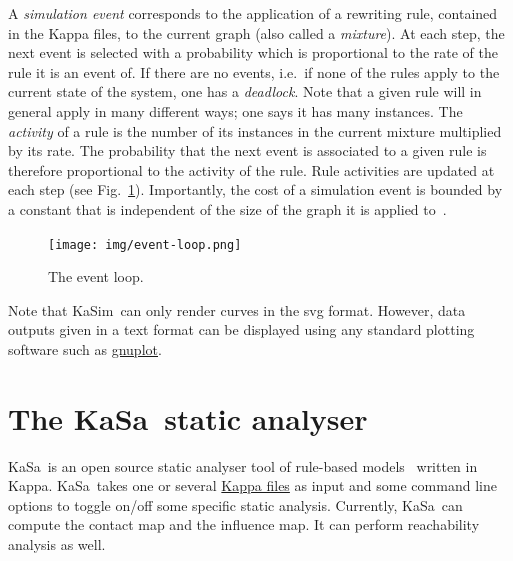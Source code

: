 \documentclass[11pt]{book}
\def\KaSim{\textsf{KaSim}}
\def\KaSa{\textsf{KaSa}}
\def\ie{i.e.~}
\begin{document}
A \emph{simulation event} corresponds to the application of a rewriting rule, contained in the Kappa files, to the current graph (also called a \emph{mixture}).
At each step, the next event %
is selected with a probability which is proportional to the rate of the rule it is an event of.
If there are no events, {\ie}if none of the rules apply to the current state of the system, one has a \emph{deadlock}. Note that a given rule will in general apply in many different ways; one says it has many instances. The \emph{activity} of a rule is the number of its instances in the current mixture multiplied by its rate. The probability that the next event is associated to a given rule is therefore proportional to the activity of the rule.
Rule activities are updated at
each step (see Fig.~\ref{fig:event-loop}). Importantly, the cost of a simulation event is bounded by a constant that is independent of the size of the graph it is applied to~\cite{Dan_etal07b}.

\begin{figure}[htbp]
\begin{center}
\texttt{[image: img/event-loop.png]}
\caption{The event loop.}
\label{fig:event-loop}
\end{center}
\end{figure}

Note that \KaSim~can only render curves in the svg format. However, data outputs given in a text format can be displayed using any standard plotting software such as \href{http://www.gnuplot.info/}{gnuplot}.

\section{The \KaSa~static analyser}

\KaSa~is an open source static analyser  tool of rule-based models~\cite{DanLan04,Dan_etal07a,Fae_etal05} written in Kappa. \KaSa~takes one or several \hyperref[chap:kappa]{Kappa files} as input and some command line options to toggle on/off some specific static analysis. Currently, \KaSa~can compute the contact map and the influence map. It can perform reachability analysis \cite{Feret-ICCMSE2007,DanosEtAl-VMCAI08} as well.
\end{document}
